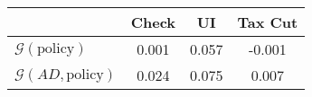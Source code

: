 \begin{tabular}{@{}lccc@{}} 
\toprule 
                          & Check      & UI    & Tax Cut    \\  \midrule 
$\mathcal{G}(\text{policy})$ & 0.001  & 0.057  & -0.001     \\ 
$\mathcal{G}(AD,\text{policy})$ & 0.024  & 0.075  & 0.007     \\ 
\end{tabular}  
